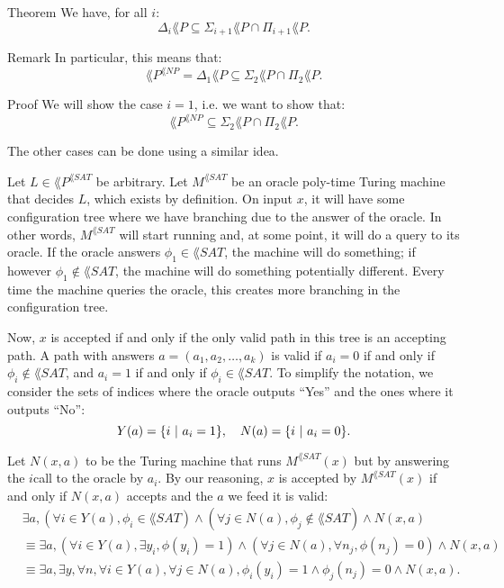 \documentclass[a4paper]{article}
\begin{document}
\begin{parag}{Theorem}
    We have, for all $i$:
    \[\Delta_i \lang{P} \subseteq \Sigma_{i+1} \lang{P} \cap \Pi_{i+1} \lang{P}.\]

    \begin{subparag}{Remark}
        In particular, this means that: 
        \[\lang{P}^{\lang{NP}} = \Delta_1 \lang{P} \subseteq \Sigma_2 \lang{P} \cap \Pi_2 \lang{P}.\]
    \end{subparag}
   
    \begin{subparag}{Proof}
        We will show the case $i = 1$, i.e. we want to show that:
        \[\lang{P}^{\lang{NP}} \subseteq \Sigma_2 \lang{P} \cap \Pi_2 \lang{P}.\]

        The other cases can be done using a similar idea.

        Let $L \in \lang{P}^{\lang{SAT}}$ be arbitrary. Let $M^{\lang{SAT}}$ be an oracle poly-time Turing machine that decides $L$, which exists by definition. On input $x$, it will have some configuration tree where we have branching due to the answer of the  oracle. In other words, $M^{\lang{SAT}}$ will start running and, at some point, it will do a query to its  oracle. If the oracle answers $\phi_1 \in \lang{SAT}$, the machine will do something; if however $\phi_1 \not\in\lang{SAT}$, the machine will do something potentially different. Every time the machine queries the oracle, this creates more branching in the configuration tree.

        Now, $x$ is accepted if and only if the only valid path in this tree is an accepting path. A path with answers $a = \left(a_1, a_2, \ldots, a_k\right)$ is valid if $a_i = 0$ if and only if $\phi_i \not \in \lang{SAT}$, and $a_i = 1$ if and only if $\phi_i \in \lang{SAT}$. To simplify the notation, we consider the sets of indices where the oracle outputs ``Yes'' and the ones where it outputs ``No'': 
        \[Y\left(a\right) = \left\{i \suchthat a_i = 1\right\}, \mathspace N\left(a\right) = \left\{i \suchthat a_i = 0\right\}.\]
        
        Let $N\left(x, a\right)$ to be the Turing machine that runs $M^{\lang{SAT}}\left(x\right)$ but by answering the $i$\Th call to the oracle by $a_i$. By our reasoning, $x$ is accepted by $M^{\lang{SAT}}\left(x\right)$ if and only if $N\left(x, a\right)$ accepts and the $a$ we feed it is valid:
        \[\begin{split}
            & \exists a, \left(\forall i \in Y\left(a\right), \phi_i \in \lang{SAT}\right) \land \left(\forall j \in N\left(a\right), \phi_j \not\in\lang{SAT}\right) \land N\left(x, a\right) \\
            & \equiv \exists a, \left(\forall i \in Y\left(a\right), \exists y_i, \phi\left(y_i\right) = 1\right) \land \left(\forall j \in N\left(a\right), \forall n_j, \phi\left(n_j\right) = 0\right) \land N\left(x, a\right) \\
            & \equiv \exists a, \exists y, \forall n, \forall i \in Y\left(a\right), \forall j \in N\left(a\right), \phi_i\left(y_i\right) = 1 \land \phi_j\left(n_j\right) = 0 \land N\left(x, a\right).
        \end{split}\]


\end{subparag}
\end{parag}
\end{document}
